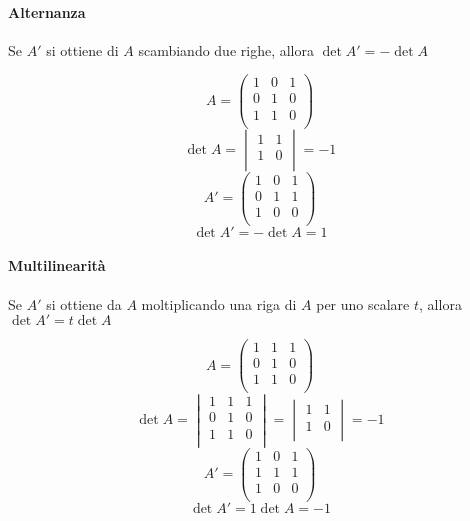 \paragraph*{Alternanza}
Se $A'$ si ottiene di $A$ scambiando due righe, allora $\det A'=-\det A$
\begin{example}
  $$
    A=
    \begin{pmatrix}
      1 & 0 & 1 \\
      0 & 1 & 0 \\
      1 & 1 & 0 \\
    \end{pmatrix}
  $$
  $$
    \det A=  
    \begin{vmatrix}
      1 & 1 \\
      1 & 0 \\
    \end{vmatrix}
    =-1
  $$
  $$
    A'=
    \begin{pmatrix}
      1 & 0 & 1 \\
      0 & 1 & 1 \\
      1 & 0 & 0 \\
    \end{pmatrix}
  $$
  $$\det A'=-\det A=1$$
\end{example}
\paragraph*{Multilinearità}
Se $A'$ si ottiene da $A$ moltiplicando una riga di $A$ per uno scalare $t$, allora $\det A'=t\det A$
\begin{example}
  $$
    A=
    \begin{pmatrix}
      1 & 1 & 1 \\
      0 & 1 & 0 \\
      1 & 1 & 0 \\
    \end{pmatrix}
  $$
  $$
    \det A=
    \begin{vmatrix}
      1 & 1 & 1 \\
      0 & 1 & 0 \\
      1 & 1 & 0 \\
    \end{vmatrix}
    =
    \begin{vmatrix}
      1 & 1 \\
      1 & 0 \\
    \end{vmatrix}
    =-1
  $$
  $$
    A'=
    \begin{pmatrix}
      1 & 0 & 1 \\
      1 & 1 & 1 \\
      1 & 0 & 0 \\
    \end{pmatrix}
  $$
  $$\det A'=1\det A=-1$$
\end{example}

